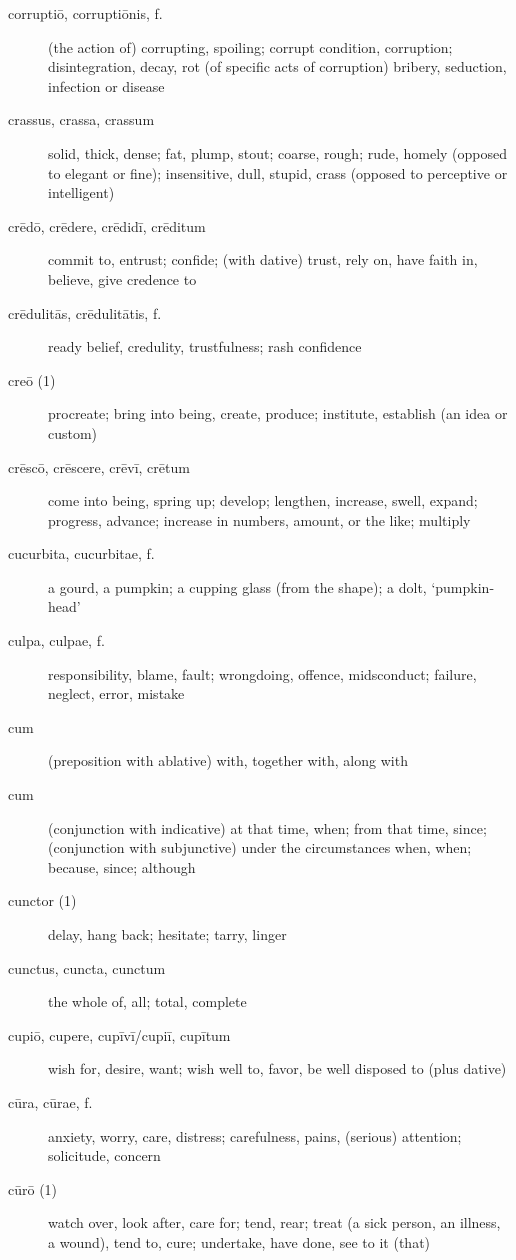 \begin{description}
    \item[corruptiō, corruptiōnis, f.] (the action of) corrupting, spoiling; corrupt condition, corruption; disintegration, decay, rot (of specific acts of corruption) bribery, seduction, infection or disease
    \item[crassus, crassa, crassum] solid, thick, dense; fat, plump, stout; coarse, rough; rude, homely (opposed to elegant or fine); insensitive, dull, stupid, crass (opposed to perceptive or intelligent)
    \item[crēdō, crēdere, crēdidī, crēditum] \marginnote{*}commit to, entrust; confide; (with dative) trust, rely on, have faith in, believe, give credence to
    \item[crēdulitās, crēdulitātis, f.] ready belief, credulity, trustfulness; rash confidence
    \item[creō (1)] \marginnote{*}procreate; bring into being, create, produce; institute, establish (an idea or custom)
    \item[crēscō, crēscere, crēvī, crētum] \marginnote{*}come into being, spring up; develop; lengthen, increase, swell, expand; progress, advance; increase in numbers, amount, or the like; multiply
    \item[cucurbita, cucurbitae, f.] a gourd, a pumpkin; a cupping glass (from the shape); a dolt, `pumpkin-head'
    \item[culpa, culpae, f.] \marginnote{*}responsibility, blame, fault; wrongdoing, offence, midsconduct; failure, neglect, error, mistake
    \item[cum] \marginnote{*}(preposition with ablative) with, together with, along with
    \item[cum] \marginnote{*}(conjunction with indicative) at that time, when; from that time, since; (conjunction with subjunctive) under the circumstances when, when; because, since; although
    \item[cunctor (1)] delay, hang back; hesitate; tarry, linger
    \item[cunctus, cuncta, cunctum] \marginnote{*}the whole of, all; total, complete
    \item[cupiō, cupere, cupīvī/cupiī, cupītum] \marginnote{*}wish for, desire, want; wish well to, favor, be well disposed to (plus dative)
    \item[cūra, cūrae, f.] \marginnote{*}anxiety, worry, care, distress; carefulness, pains, (serious) attention; solicitude, concern
    \item[cūrō (1)] \marginnote{*}watch over, look after, care for; tend, rear; treat (a sick person, an illness, a wound), tend to, cure; undertake, have done, see to it (that)

\end{description}
